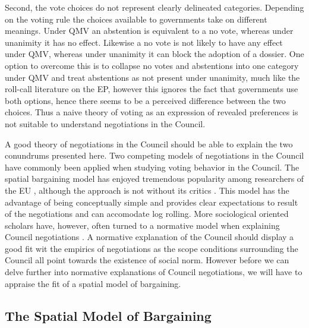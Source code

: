 Second, the vote choices do not represent clearly delineated categories. Depending on the voting rule the choices available to governments take on different meanings. Under QMV an abstention is equivalent to a no vote, whereas under unanimity it has no effect. Likewise a no vote is not likely to have any effect under QMV, whereas under unanimity it can block the adoption of a dossier. One option to overcome this is to collapse no votes and abstentions into one category under QMV and treat abstentions as not present under unanimity, much like the roll-call literature on the EP, however this ignores the fact that governments use both options, hence there seems to be a perceived difference between the two choices. Thus a naive theory of voting as an expression of revealed preferences is not suitable to understand negotiations in the Council. 

A good theory of negotiations in the Council should be able to explain the two conundrums presented here. Two competing models of negotiations in the Council have commonly been applied when studying voting behavior in the Council. The spatial bargaining model has enjoyed tremendous popularity  among researchers of the EU \citep{MattilaLane2001, Warntjen2008}, although the approach is not without its critics \citetext{see \citealt{HorlWarntjenWonka2005} for a good overview}. This model has the advantage of being conceptually simple and provides clear expectations to result of the negotiations and can accomodate log rolling. More sociological oriented scholars have, however, often turned to a normative model when explaining Council negotiations \citep{Lewis2005,Heisenberg2005}. A normative explanation of the Council should display a good fit wit the empirics of negotiations as the scope conditions surrounding the Council all point towards the existence of social norm. However before we can delve further into normative explanations of Council negotiations, we will have to appraise the fit of a spatial model of bargaining. 



\subsection{The Spatial Model of Bargaining}

